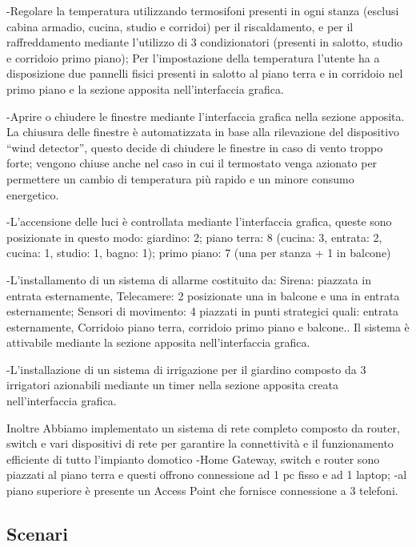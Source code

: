 \documentclass[italian, 12pt, a4paper]{article}
\begin{document}
-Regolare la temperatura utilizzando termosifoni presenti in ogni stanza (esclusi cabina armadio, cucina, studio e corridoi) per il riscaldamento, e per il raffreddamento mediante l’utilizzo di 3 condizionatori (presenti in salotto, studio e corridoio primo piano);
Per l'impostazione della temperatura l’utente ha a disposizione due pannelli fisici presenti in salotto al piano terra e in corridoio nel primo piano e la sezione apposita nell’interfaccia grafica.

-Aprire o chiudere le finestre mediante l’interfaccia grafica nella sezione apposita.
La chiusura delle finestre è automatizzata in base alla rilevazione del dispositivo “wind detector”, questo decide di chiudere le finestre in caso di vento troppo forte;
vengono chiuse anche nel caso in cui il termostato venga azionato per permettere un cambio di temperatura più rapido e un minore consumo energetico.

-L’accensione delle luci è controllata mediante l’interfaccia grafica, queste sono posizionate in questo modo:
giardino: 2;
piano terra: 8 (cucina: 3, entrata: 2, cucina: 1, studio: 1, bagno: 1);
primo piano: 7 (una per stanza + 1 in balcone)

-L'installamento di un sistema di allarme costituito da:
Sirena: piazzata in entrata esternamente, 
Telecamere: 2 posizionate una in balcone e una in entrata esternamente;
Sensori di movimento: 4 piazzati in punti strategici quali: entrata esternamente, Corridoio piano terra, corridoio primo piano e balcone..
Il sistema è attivabile mediante la sezione apposita nell’interfaccia grafica.

-L'installazione di un sistema di irrigazione per il giardino composto da 3 irrigatori azionabili mediante un timer nella sezione apposita creata nell’interfaccia grafica.

Inoltre Abbiamo implementato un sistema di rete completo composto da router, switch e vari dispositivi di rete per garantire la connettività e il funzionamento efficiente di tutto l'impianto domotico
-Home Gateway, switch e router sono piazzati al piano terra e questi offrono connessione ad 1 pc fisso e ad 1 laptop;
-al piano superiore è presente un Access Point che fornisce connessione a 3 telefoni.
\subsection{Scenari}
\clearpage

\end{document}

